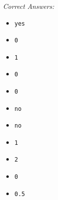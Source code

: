 \documentclass[10pt,dvips]{amsart}
\begin{document}
\par{\small{\it Correct Answers:}
\vspace{-\parskip}\begin{itemize}
\item\begin{verbatim}yes\end{verbatim}
\item\begin{verbatim}0\end{verbatim}
\item\begin{verbatim}1\end{verbatim}
\item\begin{verbatim}0\end{verbatim}
\item\begin{verbatim}0\end{verbatim}
\item\begin{verbatim}no\end{verbatim}
\item\begin{verbatim}no\end{verbatim}
\item\begin{verbatim}1\end{verbatim}
\item\begin{verbatim}2\end{verbatim}
\item\begin{verbatim}0\end{verbatim}
\item\begin{verbatim}0.5\end{verbatim}
\end{itemize}}\par
% 
% 
\end{document}
